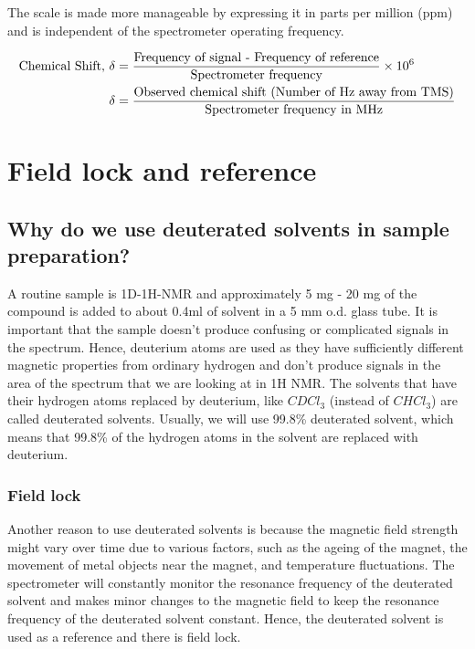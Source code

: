 \documentclass[11pt]{article}
\begin{document}
The scale is made more manageable by expressing it in parts per million (ppm) and is independent of the spectrometer operating frequency.

\begin{align*}
\text{Chemical Shift, } \delta &= \frac{\text{Frequency of signal - Frequency of reference}}{\text{Spectrometer frequency}} \times 10^6 \\
\delta &= \frac{\text{Observed chemical shift (Number of \si{\hertz} away from TMS)}}{\text{Spectrometer frequency in \si{\mega\hertz}}}
\end{align*}
\section{Field lock and reference}
\label{sec:org76f5195}

\subsection{Why do we use deuterated solvents in sample preparation?}
\label{sec:orgb869ded}
A routine sample is 1D-1H-NMR and approximately 5 mg - 20 mg of the compound is added to about 0.4ml of solvent in a 5 mm o.d. glass tube. It is important that the sample doesn't produce confusing or complicated signals in the spectrum. Hence, deuterium atoms are used as they have sufficiently different magnetic properties from ordinary hydrogen and don't produce signals in the area of the spectrum that we are looking at in 1H NMR. The solvents that have their hydrogen atoms replaced by deuterium, like \(CDCl_3\) (instead of \(CHCl_3\)) are called deuterated solvents. Usually, we will use 99.8\% deuterated solvent, which means that 99.8\% of the hydrogen atoms in the solvent are replaced with deuterium.

\newpage
\subsubsection{Field lock}
\label{sec:org259a97d}
Another reason to use deuterated solvents is because the magnetic field strength might vary over time due to various factors, such as the ageing of the magnet, the movement of metal objects near the magnet, and temperature fluctuations. The spectrometer will constantly monitor the resonance frequency of the deuterated solvent and makes minor changes to the magnetic field to keep the resonance frequency of the deuterated solvent constant. Hence, the deuterated solvent is used as a reference and there is field lock.
\end{document}

